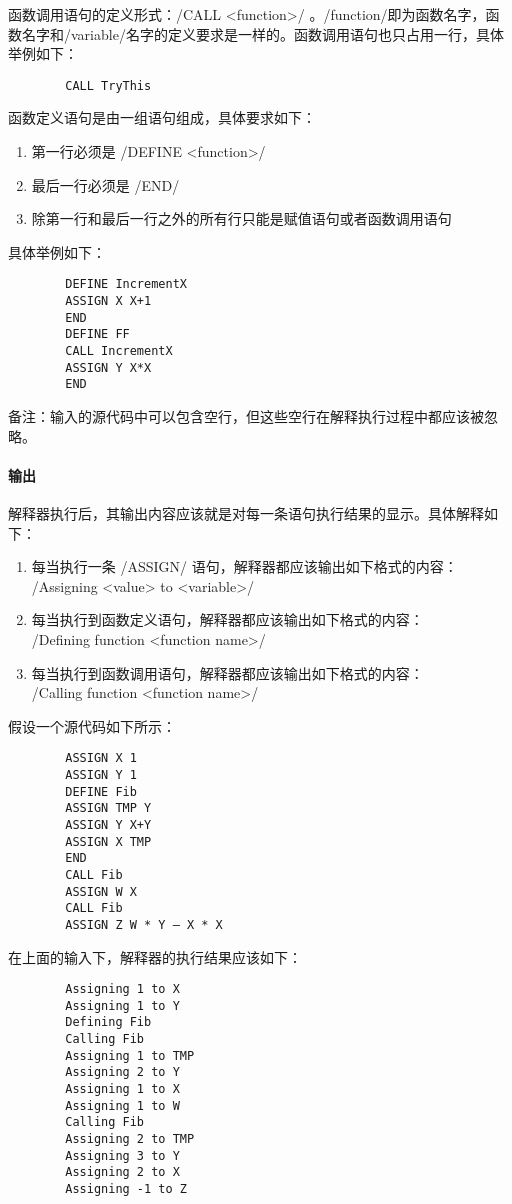 \documentclass[UTF8]{ctexart}
\begin{document}
        函数调用语句的定义形式：\code/CALL <function>/ 。\code/function/即为函数名字，函数名字和\code/variable/名字的定义要求是一样的。函数调用语句也只占用一行，具体举例如下：
        \begin{verbatim}
        CALL TryThis
        \end{verbatim}

        函数定义语句是由一组语句组成，具体要求如下：
        \begin{enumerate}
          \item 第一行必须是 \code/DEFINE <function>/
          \item 最后一行必须是 \code/END/
          \item 除第一行和最后一行之外的所有行只能是赋值语句或者函数调用语句
        \end{enumerate}
        具体举例如下：
        \begin{verbatim}
        DEFINE IncrementX
        ASSIGN X X+1
        END
        DEFINE FF
        CALL IncrementX
        ASSIGN Y X*X
        END
        \end{verbatim}

        备注：输入的源代码中可以包含空行，但这些空行在解释执行过程中都应该被忽略。
        \paragraph{输出}
        解释器执行后，其输出内容应该就是对每一条语句执行结果的显示。具体解释如下：
        \begin{enumerate}
          \item 每当执行一条 \code/ASSIGN/ 语句，解释器都应该输出如下格式的内容：\\\code/Assigning <value> to <variable>/
          \item 每当执行到函数定义语句，解释器都应该输出如下格式的内容： \\\code/Defining function <function name>/
          \item 每当执行到函数调用语句，解释器都应该输出如下格式的内容： \\\code/Calling function <function name>/
        \end{enumerate}
        假设一个源代码如下所示：
        \begin{verbatim}
        ASSIGN X 1
        ASSIGN Y 1
        DEFINE Fib
        ASSIGN TMP Y
        ASSIGN Y X+Y
        ASSIGN X TMP
        END
        CALL Fib
        ASSIGN W X
        CALL Fib
        ASSIGN Z W * Y – X * X
        \end{verbatim}
        在上面的输入下，解释器的执行结果应该如下：
        \begin{verbatim}
        Assigning 1 to X
        Assigning 1 to Y
        Defining Fib
        Calling Fib
        Assigning 1 to TMP
        Assigning 2 to Y
        Assigning 1 to X
        Assigning 1 to W
        Calling Fib
        Assigning 2 to TMP
        Assigning 3 to Y
        Assigning 2 to X
        Assigning -1 to Z
        \end{verbatim}
\end{document}
